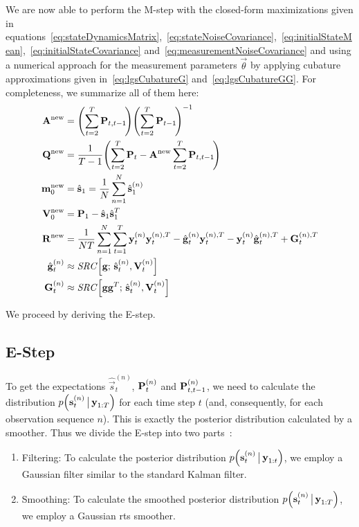 	We are now able to perform the M-step with the closed-form maximizations given in equations~\eqref{eq:stateDynamicsMatrix},~\eqref{eq:stateNoiseCovariance},~\eqref{eq:initialStateMean},~\eqref{eq:initialStateCovariance} and~\eqref{eq:measurementNoiseCovariance} and using a numerical approach for the measurement parameters \(\vec{\theta}\) by applying cubature approximations given in~\eqref{eq:lgsCubatureG} and~\eqref{eq:lgsCubatureGG}. For completeness, we summarize all of them here:
	\begin{align*}
		\boldsymbol{\mathrm{A}}^{\mathrm{new}} &= \Bigg(\! \sum_{t = 2}^{T} \boldsymbol{\mathrm{P}}_{t, t - 1} \!\Bigg) \Bigg(\! \sum_{t = 2}^{T} \boldsymbol{\mathrm{P}}_{t - 1} \!\Bigg)^{-1} \\
		\boldsymbol{\mathrm{Q}}^{\mathrm{new}} &= \frac{1}{T - 1} \Bigg(\! \sum_{t = 2}^{T} \boldsymbol{\mathrm{P}}_t - \boldsymbol{\mathrm{A}}^{\mathrm{new}} \sum_{t = 2}^{T} \boldsymbol{\mathrm{P}}_{t, t - 1} \!\Bigg) \\
		\boldsymbol{\mathrm{m}}_0^{\mathrm{new}} &= \hat{\boldsymbol{\mathrm{s}}}_1 = \frac{1}{N} \sum_{n = 1}^{N} \hat{\boldsymbol{\mathrm{s}}}_1^{(n)} \\
		\boldsymbol{\mathrm{V}}_0^{\mathrm{new}} &= \boldsymbol{\mathrm{P}}_1 - \hat{\boldsymbol{\mathrm{s}}}_1 \hat{\boldsymbol{\mathrm{s}}}_1^T \\
		\boldsymbol{\mathrm{R}}^{\mathrm{new}} &= \frac{1}{NT} \sum_{n = 1}^{N} \sum_{t = 1}^{T} \boldsymbol{\mathrm{y}}_t^{(n)} \boldsymbol{\mathrm{y}}_t^{(n), T} - \hat{\boldsymbol{\mathrm{g}}}_t^{(n)} \boldsymbol{\mathrm{y}}_t^{(n), T} - \boldsymbol{\mathrm{y}}_t^{(n)} \hat{\boldsymbol{\mathrm{g}}}_t^{(n), T} + \boldsymbol{\mathrm{G}}_t^{(n), T} \\
		\hat{\boldsymbol{\mathrm{g}}}_t^{(n)} &\approx \mathit{SRC}\Big[\boldsymbol{\mathrm{g}};\, \hat{\boldsymbol{\mathrm{s}}}_t^{(n)}, \boldsymbol{\mathrm{V}}_t^{(n)}\Big] \\
		\boldsymbol{\mathrm{G}}_t^{(n)} &\approx \mathit{SRC}\Big[\boldsymbol{\mathrm{g}} \boldsymbol{\mathrm{g}}^T;\, \hat{\boldsymbol{\mathrm{s}}}_t^{(n)}, \boldsymbol{\mathrm{V}}_t^{(n)}\Big]
	\end{align*}

	We proceed by deriving the E-step.

\subsection{E-Step}
	To get the expectations \( \hat{\vec{s}}_t^{(n)} \), \( \boldsymbol{\mathrm{P}}_{t}^{(n)} \) and \( \boldsymbol{\mathrm{P}}_{t, t - 1}^{(n)} \), we need to calculate the distribution \( p\Big(\boldsymbol{\mathrm{s}}_t^{(n)} \,\big\vert\, \boldsymbol{\mathrm{y}}_{1:T}\Big) \) for each time step \(t\) (and, consequently, for each observation sequence \(n\)). This is exactly the posterior distribution calculated by a smoother. Thus we divide the E-step into two parts~\cite{minkaHiddenMarkovModels1999}:
	\begin{enumerate}
		\item Filtering: To calculate the posterior distribution \( p\Big(\boldsymbol{\mathrm{s}}_t^{(n)} \,\big\vert\, \boldsymbol{\mathrm{y}}_{1:t}\Big) \), we employ a Gaussian filter similar to the standard Kalman filter.
		\item Smoothing: To calculate the smoothed posterior distribution \( p\Big(\boldsymbol{\mathrm{s}}_t^{(n)} \,\big\vert\, \boldsymbol{\mathrm{y}}_{1:T}\Big) \), we employ a Gaussian \ac{rts} smoother.
	\end{enumerate}

